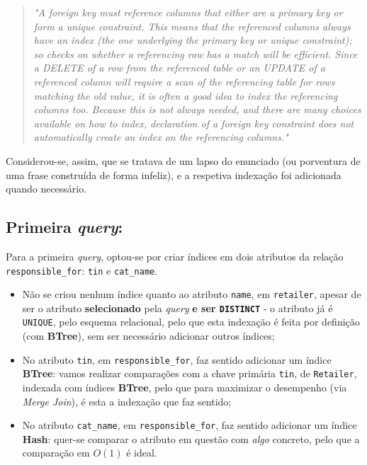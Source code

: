 \documentclass[12pt,a4paper]{article}
\begin{document}
\begin{quote}
  \textit{"A foreign key must reference columns that either are a primary key or form a unique
    constraint. This means that the referenced columns always have an index (the one
    underlying the primary key or unique constraint); so checks on whether a referencing
    row has a match will be efficient. Since a DELETE of a row from the referenced
    table or an UPDATE of a referenced column will require a scan of the referencing
    table for rows matching the old value, it is often a good idea to index the referencing
    columns too. Because this is not always needed, and there are many choices available
    on how to index, declaration of a foreign key constraint does not automatically
    create an index on the referencing columns."}
\end{quote}

Considerou-se, assim, que se tratava de um lapso do enunciado (ou porventura de uma
frase construída de forma infeliz), e a respetiva indexação foi adicionada quando necessário.

\subsection*{Primeira \textit{query}:}



Para a primeira \textit{query}, optou-se por criar índices em dois atributos da relação \texttt{responsible\_for}:
\texttt{tin} e \texttt{cat\_name}.

\vspace*{0.25cm}

\begin{itemize}
  \item Não se criou nenhum índice quanto ao atributo \texttt{name}, em \texttt{retailer},
        apesar de ser o atributo \textbf{selecionado} pela \textit{query} \textbf{e ser
          \texttt{DISTINCT}} - o atributo já é \texttt{UNIQUE}, pelo
        esquema relacional, pelo que esta indexação é feita por definição (com
        \textbf{BTree}), sem ser necessário adicionar outros índices;

  \item No atributo \texttt{tin}, em \texttt{responsible\_for}, faz sentido adicionar um
        índice \textbf{BTree}: vamos realizar comparações com a chave primária \texttt{tin},
        de \texttt{Retailer}, indexada com índices \textbf{BTree}, pelo que para maximizar
        o desempenho (via \textit{Merge Join}), é esta a indexação que faz sentido;

  \item No atributo \texttt{cat\_name}, em \texttt{responsible\_for}, faz sentido adicionar
        um índice \textbf{Hash}: quer-se comparar o atributo em questão com \textit{algo}
        concreto, pelo que a comparação em $O(1)$ é ideal.
\end{itemize}
\end{document}
